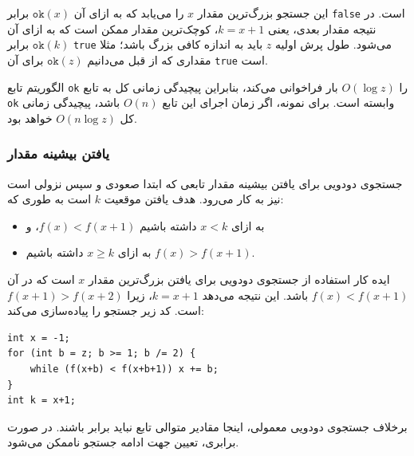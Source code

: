 این جستجو بزرگ‌ترین مقدار $x$ را می‌یابد که به ازای آن $\texttt{ok}(x)$ برابر \texttt{false} است. در نتیجه مقدار بعدی، یعنی $k=x+1$، کوچک‌ترین مقدار ممکن است که به ازای آن $\texttt{ok}(k)$ برابر \texttt{true} می‌شود. طول پرش اولیه $z$ باید به اندازه کافی بزرگ باشد؛ مثلا مقداری که از قبل می‌دانیم $\texttt{ok}(z)$ برای آن \texttt{true} است.

الگوریتم تابع \texttt{ok} را $O(\log z)$ بار فراخوانی می‌کند، بنابراین پیچیدگی زمانی کل به تابع \texttt{ok} وابسته است. برای نمونه، اگر زمان اجرای این تابع $O(n)$ باشد، پیچیدگی زمانی کل $O(n \log z)$ خواهد بود.

\subsubsection{یافتن بیشینه مقدار}

جستجوی دودویی برای یافتن بیشینه مقدار تابعی که ابتدا صعودی و سپس نزولی است نیز به کار می‌رود. هدف یافتن موقعیت $k$ است به طوری که:

\begin{itemize}
\item
به ازای $x<k$ داشته باشیم $f(x)<f(x+1)$، و
\item
به ازای $x \ge k$ داشته باشیم $f(x)>f(x+1)$.
\end{itemize}

ایده کار استفاده از جستجوی دودویی برای یافتن بزرگ‌ترین مقدار $x$ است که در آن $f(x)<f(x+1)$ باشد. این نتیجه می‌دهد $k=x+1$، زیرا $f(x+1)>f(x+2)$ است. کد زیر جستجو را پیاده‌سازی می‌کند:

\begin{lstlisting}
int x = -1;
for (int b = z; b >= 1; b /= 2) {
    while (f(x+b) < f(x+b+1)) x += b;
}
int k = x+1;
\end{lstlisting}

برخلاف جستجوی دودویی معمولی، اینجا مقادیر متوالی تابع نباید برابر باشند. در صورت برابری، تعیین جهت ادامه جستجو ناممکن می‌شود.